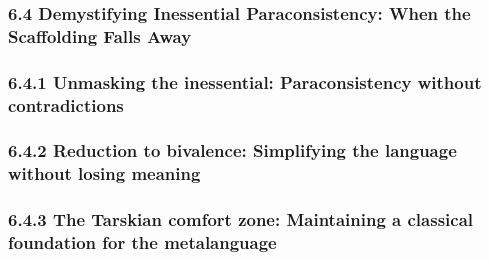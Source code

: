 \hypertarget{demystifying-inessential-paraconsistency-when-the-scaffolding-falls-away}{%
\subsubsection*{\texorpdfstring{\textbf{6.4 Demystifying Inessential
Paraconsistency: When the Scaffolding Falls Away}
}{6.4 Demystifying Inessential Paraconsistency: When the Scaffolding Falls Away }}\label{demystifying-inessential-paraconsistency-when-the-scaffolding-falls-away}}

\hypertarget{unmasking-the-inessential-paraconsistency-without-contradictions}{%
\subsubsection*{\texorpdfstring{6.4.1 Unmasking the inessential:
Paraconsistency without contradictions
}{6.4.1 Unmasking the inessential: Paraconsistency without contradictions }}\label{unmasking-the-inessential-paraconsistency-without-contradictions}}

\hypertarget{reduction-to-bivalence-simplifying-the-language-without-losing-meaning}{%
\subsubsection*{\texorpdfstring{6.4.2 Reduction to bivalence:
Simplifying the language without losing meaning
}{6.4.2 Reduction to bivalence: Simplifying the language without losing meaning }}\label{reduction-to-bivalence-simplifying-the-language-without-losing-meaning}}

\hypertarget{the-tarskian-comfort-zone-maintaining-a-classical-foundation-for-the-metalanguage}{%
\subsubsection*{6.4.3 The Tarskian comfort zone: Maintaining a classical
foundation for the
metalanguage}\label{the-tarskian-comfort-zone-maintaining-a-classical-foundation-for-the-metalanguage}}

